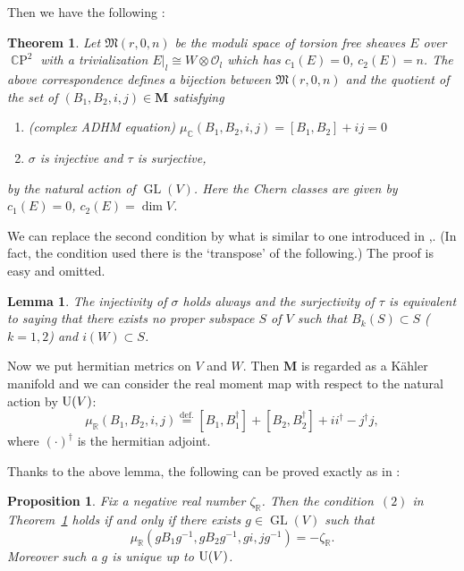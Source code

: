 \documentclass[12pt]{amsart}
\newcommand{\cal}{\mathcal}
\newcommand{\rom}{\text}
\renewcommand{\frak}{\mathfrak}
\newtheorem{Theorem}[equation]{Theorem}
\newtheorem{Lemma}[equation]{Lemma}
\newtheorem{Proposition}[equation]{Proposition}
\theoremstyle{definition}
\theoremstyle{remark}
\numberwithin{equation}{section}
\newcommand{\thmref}[1]{Theorem~\ref{#1}}
\newcommand{\defeq}{\overset{\operatorname{\scriptstyle def.}}{=}}
\newcommand{\C}{{\mathbb C}}
\newcommand{\R}{{\mathbb R}}
\newcommand{\CP}{\operatorname{\C P}}
\newcommand{\GL}{\operatorname{GL}}
\newcommand{\U}{\operatorname{\rm U}}
\newcommand{\shfO}{\cal O} %
\newcommand{\bM}{{\mathbf M}} %
\newcommand{\M}{{\frak M}} %
\begin{document}
Then we have the following \cite{Vect}:
\begin{Theorem}
  Let $\M(r,0,n)$ be the moduli space of torsion free sheaves $E$ over
  $\CP^2$ with a trivialization $E|_l\cong W\otimes\shfO_l$ which has
  $c_1(E) = 0$, $c_2(E) = n$.
  The above correspondence defines a bijection between $\M(r,0,n)$ and
  the quotient of the set of $(B_1, B_2, i, j)\in\bM$ satisfying
  \begin{enumerate}
  \item \rom(complex ADHM equation\rom) $\mu_\C(B_1, B_2, i, j) =
    [B_1, B_2] + ij = 0$
  \item $\sigma$ is injective and $\tau$ is surjective,
  \end{enumerate}
  by the natural action of $\GL(V)$. Here the Chern classes are given
  by $c_1(E) = 0$, $c_2(E) = \dim V$.
\label{thm:monad}\end{Theorem}

We can replace the second condition by what is similar to one
introduced in \cite[3.5]{Na-quiver},\cite[3.8]{Na-alg}.
(In fact, the condition used there is the `transpose' of the following.)
The proof is easy and omitted.
\begin{Lemma}
  The injectivity of $\sigma$ holds always and the surjectivity of
  $\tau$ is equivalent to saying that there exists no proper subspace
  $S$ of $V$ such that $B_k(S)\subset S$ \rom($k=1,2$\rom) and
  $i(W)\subset S$.
\label{lem:stable}\end{Lemma}

Now we put hermitian metrics on $V$ and $W$. Then $\bM$ is regarded as
a K\"ahler manifold and we can consider the real moment map with
respect to the natural action by $\U(V)$:
\begin{equation*}
  \mu_\R(B_1, B_2, i, j) \defeq [B_1, B_1^\dagger] + [B_2, B_2^\dagger]
  + i i^\dagger - j^\dagger j,
\end{equation*}
where $(\cdot)^\dagger$ is the hermitian adjoint.

Thanks to the above
lemma, the following can be proved exactly as in
\cite[3.5]{Na-quiver}:
\begin{Proposition}
  Fix a negative real number $\zeta_\R$. Then the
  condition~$(2)$ in \thmref{thm:monad} holds if and only if there
  exists $g\in\GL(V)$ such that
  \begin{equation*}
    \mu_\R(g B_1 g^{-1}, g B_2 g^{-1}, g i, j g^{-1}) = - \zeta_\R.
  \end{equation*}
Moreover such a $g$ is unique up to $\U(V)$.
\end{Proposition}
\end{document}
